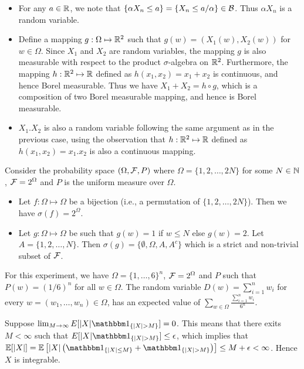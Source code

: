 \begin{itemize}
    \item For any $a\in \mathbb{R}$, we note that $\{ \alpha X_n \leq a\} = \{ X_n \leq a/\alpha\} \in \mathcal{B}$. Thus $\alpha X_n$ is a random variable. 
    
    \item Define a mapping $g:\Omega \mapsto \mathbb{R}^2$ such that $g(w) = (X_1(w), X_2(w))$ for $w\in \Omega$. Since $X_1$ and $X_2$ are random variables, the mapping $g$ is also measurable with respect to the product $\sigma$-algebra on $\mathbb{R}^2$. Furthermore, the mapping $h:\mathbb{R}^2 \mapsto \mathbb{R}$ defined as $h(x_1, x_2) = x_1 + x_2$ is continuous, and hence Borel measurable. Thus we have $X_1 + X_2 = h \circ g$, which is a composition of two Borel measurable mapping, and hence is Borel measurable. 
    
    \item $X_1.X_2$ is also a random variable following the same argument as in the previous case, using the observation that $h:\mathbb{R}^2 \mapsto \mathbb{R}$ defined as $h(x_1, x_2) = x_1.x_2$ is also a continuous mapping. 
\end{itemize}

Consider the probability space $(\Omega, \mathcal{F}, P)$ where $\Omega = \{1,2,\ldots, 2N\}$ for some $N \in \mathbb{N}$, $\mathcal{F} = 2^{\Omega}$ and $P$ is the uniform measure over $\Omega$. 
\begin{itemize}
    \item Let $f:\Omega \mapsto \Omega$ be a bijection (i.e., a permutation of $\{1,2,\ldots, 2N\}$). Then we have $\sigma(f) = 2^\Omega$. 
    
    \item Let $g:\Omega \mapsto \Omega$ be such that $g(w)=1$ if $w \leq N$ else $g(w)=2$. Let $A = \{1,2,\ldots, N\}$. Then $\sigma(g) = \{\emptyset, \Omega, A, A^c\}$ which is a strict and non-trivial subset of $\mathcal{F}$. 
\end{itemize}

 For this experiment, we have $\Omega = \{1,\ldots, 6\}^n$, $\mathcal{F}=2^\Omega$ and $P$ such that $P(w) = (1/6)^n$ for all $w\in \Omega$.
The random variable $D(w) = \sum_{i=1}^nw_i$ for every $w=(w_1,\ldots, w_n)\in \Omega$, has an expected value of $\sum_{w \in \Omega} \frac{\sum_{i=1}^n w_i}{6^n}$. 

 Suppose $\lim_{M \to \infty} E[|X| \indi{|X|>M}] = 0$. This means that there exits $M<\infty$ such that $E[|X|\indi{|X|>M}] \leq \epsilon$, which implies that $\mbb{E}[|X|] = \mbb{E}\lb |X|\lp \indi{|X|\leq M} + \indi{|X|>M} \rp \rb \leq M + \epsilon <\infty$. Hence $X$ is integrable. 


